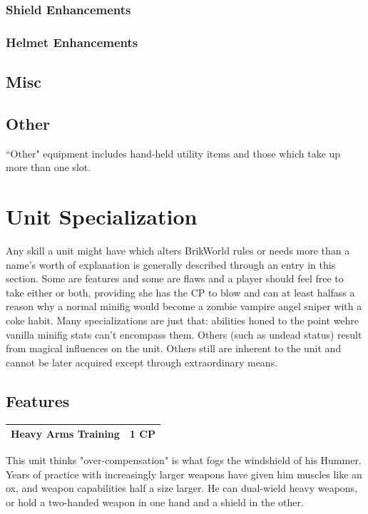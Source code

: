 \documentclass[12pt,a4paper,twocolumn]{article}
\begin{document}
\subsubsection{Shield Enhancements}

\subsubsection{Helmet Enhancements}

\subsection{Misc}

\subsection{Other}

``Other" equipment includes hand-held utility items and those which take up more than one slot.

\section{Unit Specialization}

Any skill a unit might have which alters BrikWorld rules or needs more than a name's worth of explanation is generally described through an entry in this section.  Some are features and some are flaws and a player should feel free to take either or both, providing she has the CP to blow and can at least halfass a reason why a normal minifig would become a zombie vampire angel sniper with a coke habit.  Many specializations are just that: abilities honed to the point wehre vanilla minifig stats can't encompass them.  Others (such as undead status) result from magical influences on the unit.  Others still are inherent to the unit and cannot be later acquired except through extraordinary means.

\subsection{Features}

\begin{tabular}{|l|c|} \hline
Heavy Arms Training & 1 CP \\ \hline
\end{tabular}

This unit thinks "over-compensation" is what fogs the windshield of his Hummer.  Years of practice with increasingly larger weapons have given him muscles like an ox, and weapon capabilities half a size larger.  He can dual-wield heavy weapons, or hold a two-handed weapon in one hand and a shield in the other.
\end{document}
